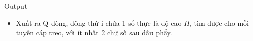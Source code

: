 Output  
\begin{itemize}
	\item     Xuất ra Q dòng, dòng thứ i chứa 1 số thực là độ cao    \textbf{     $H_{i}$}    tìm được cho mỗi tuyến cáp treo, với ít nhất 2 chữ số sau dấu phẩy.   
\end{itemize}